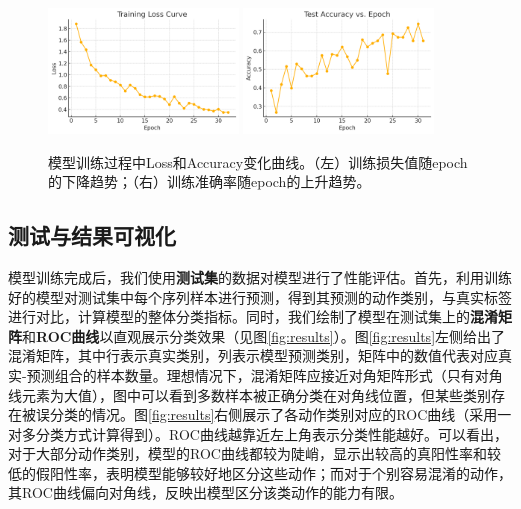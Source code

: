 \documentclass[UTF8]{article}
\begin{document}
\begin{figure}[htbp]
    \centering
    \includegraphics[width=0.45\textwidth]{loss_curve.png}
    \quad
    \includegraphics[width=0.45\textwidth]{acc_curve.png}
    \caption{模型训练过程中Loss和Accuracy变化曲线。（左）训练损失值随epoch的下降趋势；（右）训练准确率随epoch的上升趋势。}
    \label{fig:train}
\end{figure}

\subsection{测试与结果可视化}

模型训练完成后，我们使用\textbf{测试集}的数据对模型进行了性能评估。首先，利用训练好的模型对测试集中每个序列样本进行预测，得到其预测的动作类别，与真实标签进行对比，计算模型的整体分类指标。同时，我们绘制了模型在测试集上的\textbf{混淆矩阵}和\textbf{ROC曲线}以直观展示分类效果（见图\ref{fig:results}）。图\ref{fig:results}左侧给出了混淆矩阵，其中行表示真实类别，列表示模型预测类别，矩阵中的数值代表对应真实-预测组合的样本数量。理想情况下，混淆矩阵应接近对角矩阵形式（只有对角线元素为大值），图中可以看到多数样本被正确分类在对角线位置，但某些类别存在被误分类的情况。图\ref{fig:results}右侧展示了各动作类别对应的ROC曲线（采用一对多分类方式计算得到）。ROC曲线越靠近左上角表示分类性能越好。可以看出，对于大部分动作类别，模型的ROC曲线都较为陡峭，显示出较高的真阳性率和较低的假阳性率，表明模型能够较好地区分这些动作；而对于个别容易混淆的动作，其ROC曲线偏向对角线，反映出模型区分该类动作的能力有限。
\end{document}
